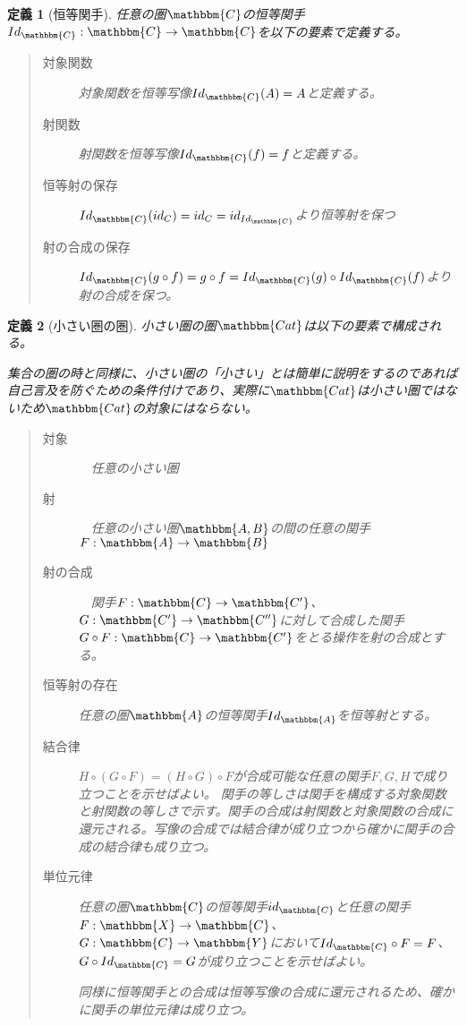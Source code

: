 \documentclass[dvipdfmx]{jsarticle}
\newcommand{\cat}[1]{\mathbbm{#1}}
\newcommand{\arrow}{\rightarrow}
\newcommand{\functor}[3]{#1:\cat{#2}\arrow \cat{#3}}
\newtheorem{define}{定義}[section]
\numberwithin{proof}{subsection}
\numberwithin{prop}{subsection}
\numberwithin{define}{subsection}
\begin{document}
	\begin{define}[恒等関手]
		任意の圏$\cat{C}$の恒等関手$\functor{Id_{\cat{C}}}{C}{C}$を以下の要素で定義する。
		\begin{quote}
			\begin{description}
				\item[対象関数] 対象関数を恒等写像$Id_{\cat{C}}(A)=A$と定義する。
				\item[射関数] 射関数を恒等写像$Id_{\cat{C}}(f)=f$と定義する。
				\item[恒等射の保存] $Id_{\cat{C}}(id_C)=id_C=id_{Id_{\cat{C}}}$より恒等射を保つ
				\item[射の合成の保存] $Id_{\cat{C}}(g\circ f)=g\circ f=Id_{\cat{C}}(g)\circ Id_{\cat{C}}(f)$より射の合成を保つ。
			\end{description}
		\end{quote}
	\end{define}
	\begin{define}[小さい圏の圏]
		小さい圏の圏$\cat{Cat}$は以下の要素で構成される。

		集合の圏の時と同様に、小さい圏の「小さい」とは簡単に説明をするのであれば自己言及を防ぐための条件付けであり、実際に$\cat{Cat}$は小さい圏ではないため$\cat{Cat}$の対象にはならない。
		\begin{quote}
			\begin{description}
				\item[対象]　任意の小さい圏
				\item[射]　任意の小さい圏$\cat{A,B}$の間の任意の関手$\functor{F}{A}{B}$
				\item[射の合成]　関手$\functor{F}{C}{C'}$、$\functor{G}{C'}{C''}$に対して合成した関手$\functor{G\circ F}{C}{C'}$をとる操作を射の合成とする。
				\item[恒等射の存在]任意の圏$\cat{A}$の恒等関手$Id_{\cat{A}}$を恒等射とする。
				\item[結合律]
				$H\circ (G\circ F)=(H\circ G)\circ F$が合成可能な任意の関手$F,G,H$で成り立つことを示せばよい。
				関手の等しさは関手を構成する対象関数と射関数の等しさで示す。関手の合成は射関数と対象関数の合成に還元される。写像の合成では結合律が成り立つから確かに関手の合成の結合律も成り立つ。
				\item[単位元律]
				任意の圏$\cat{C}$の恒等関手$id_{\cat{C}}$と任意の関手$\functor{F}{X}{C}$、$\functor{G}{C}{Y}$において$Id_{\cat{C}}\circ F=F$、$G\circ Id_{\cat{C}}=G$が成り立つことを示せばよい。

				同様に恒等関手との合成は恒等写像の合成に還元されるため、確かに関手の単位元律は成り立つ。
			\end{description}
		\end{quote}
	\end{define}
\end{document}
